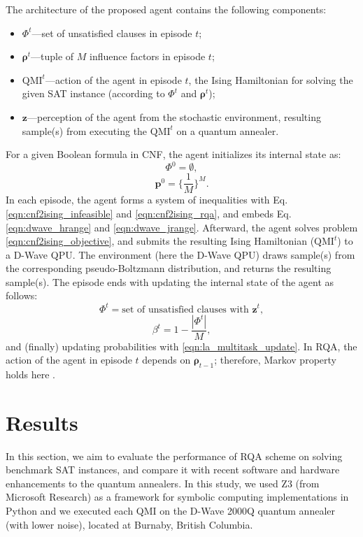 \documentclass[fleqn,10pt]{wlscirep}
\begin{document}
The architecture of the proposed agent contains the following components: 
\begin{itemize}
	\item $\Phi^t$—set of unsatisfied clauses in episode ${t}$;
	\item $\boldsymbol{\rho}^t$—tuple of ${M}$ influence factors in episode ${t}$;
	\item $\mathrm{QMI}^t$—action of the agent in episode ${t}$, the Ising Hamiltonian for solving the given SAT instance (according to $\Phi^t$ and $\boldsymbol{\rho}^t$);
	\item $\mathbf{z}$—perception of the agent from the stochastic environment, resulting sample(s) from executing the $\mathrm{QMI}^{t}$ on a quantum annealer. 
\end{itemize}
For a given Boolean formula in CNF, the agent initializes its internal state as:
\[
	\Phi^0 = \emptyset,
\]
\[
	\boldsymbol{p}^0 = \{\frac{1}{M}\}^M.
\]
In each episode, the agent forms a system of inequalities with Eq. \eqref{eqn:cnf2ising_infeasible} and \eqref{eqn:cnf2ising_rqa}, and embeds Eq. \eqref{eqn:dwave_hrange} and \eqref{eqn:dwave_jrange}. Afterward, the agent solves problem \eqref{eqn:cnf2ising_objective}, and submits the resulting Ising Hamiltonian ($\mathrm{QMI}^t $) to a D-Wave QPU. The environment (here the D-Wave QPU) draws sample(s) from the corresponding pseudo-Boltzmann distribution, and returns the resulting sample(s).
The episode ends with updating the internal state of the agent as follows: 
\[
	\Phi^{t} = \text{set of unsatisfied clauses with } \mathbf{z}^t,
\] 
\[
	\beta^t =1 - \frac{\left|{\Phi^{t}}\right|}{M},
\]
and (finally) updating probabilities with \eqref{eqn:la_multitask_update}. In RQA, the action of the agent in episode ${t}$ depends on $\boldsymbol{\rho}_{t-1}$; therefore, Markov property holds here \cite{cox2017theory}. 
	

\section*{Results} 
In this section, we aim to evaluate the performance of RQA scheme on solving benchmark SAT instances, and compare it with recent software and hardware enhancements to the quantum annealers. In this study, we used Z3 (from Microsoft Research) as a framework for symbolic computing implementations in Python \cite{de2008z3} and we executed each QMI on the D-Wave 2000Q quantum annealer (with lower noise), located at Burnaby, British Columbia.
\end{document}
